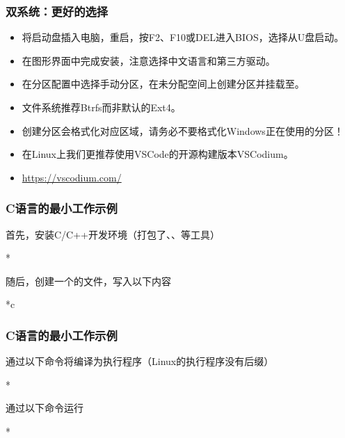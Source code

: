 \begin{frame}
    \frametitle{双系统：更好的选择}
    \begin{itemize}
        \item 将启动盘插入电脑，重启，按F2、F10或DEL进入BIOS，选择从U盘启动。
        \item 在图形界面中完成安装，注意选择中文语言和第三方驱动。
        \item 在分区配置中选择手动分区，在未分配空间上创建分区并挂载至\code{/}。
        \item 文件系统推荐Btrfs而非默认的Ext4。
        \item \alert{创建分区会格式化对应区域，请务必不要格式化Windows正在使用的分区！}
        \item 在Linux上我们更推荐使用VSCode的开源构建版本VSCodium。
        \item \url{https://vscodium.com/}
    \end{itemize}
\end{frame}

\begin{frame}
    \frametitle{C语言的最小工作示例}
    首先，安装C/C++开发环境（打包了、、等工具）
    \begin{Code}*
        
    \end{Code}
    随后，创建一个的文件，写入以下内容
    \begin{Code}*{c}
        
    \end{Code}
\end{frame}

\begin{frame}
    \frametitle{C语言的最小工作示例}
    通过以下命令将编译为执行程序（Linux的执行程序没有后缀）
    \begin{Code}*
        
    \end{Code}
    通过以下命令运行 
    \begin{Code}*
        
    \end{Code}
\end{frame}
